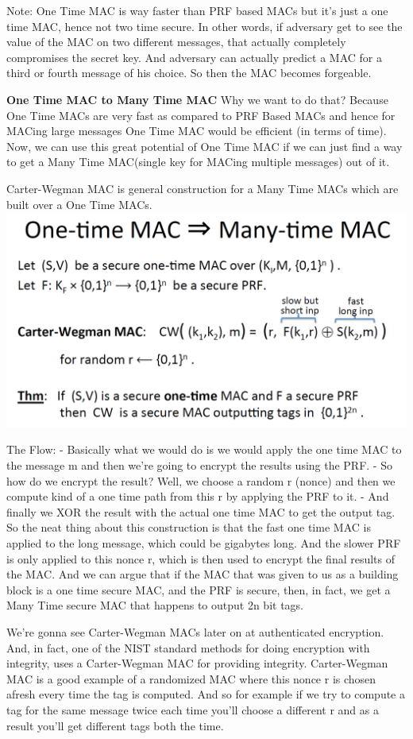 \documentclass[11pt]{article}
\makeatletter
\def\maxwidth{\ifdim\Gin@nat@width>\linewidth\linewidth
    \else\Gin@nat@width\fi}
\let\Oldincludegraphics\includegraphics
\renewcommand{\includegraphics}[1]{\Oldincludegraphics[width=.8\maxwidth]{#1}}
\makeatother
\begin{document}
Note: One Time MAC is way faster than PRF based MACs but it's just a one
time MAC, hence not two time secure. In other words, if adversary get to
see the value of the MAC on two different messages, that actually
completely compromises the secret key. And adversary can actually
predict a MAC for a third or fourth message of his choice. So then the
MAC becomes forgeable.

\textbf{One Time MAC to Many Time MAC} Why we want to do that? Because
One Time MACs are very fast as compared to PRF Based MACs and hence for
MACing large messages One Time MAC would be efficient (in terms of
time). Now, we can use this great potential of One Time MAC if we can
just find a way to get a Many Time MAC(single key for MACing multiple
messages) out of it.

Carter-Wegman MAC is general construction for a Many Time MACs which are
built over a One Time MACs. \includegraphics{./Images/OTM2MTM.png}

The Flow: - Basically what we would do is we would apply the one time
MAC to the message m and then we're going to encrypt the results using
the PRF. - So how do we encrypt the result? Well, we choose a random r
(nonce) and then we compute kind of a one time path from this r by
applying the PRF to it. - And finally we XOR the result with the actual
one time MAC to get the output tag. So the neat thing about this
construction is that the fast one time MAC is applied to the long
message, which could be gigabytes long. And the slower PRF is only
applied to this nonce r, which is then used to encrypt the final results
of the MAC. And we can argue that if the MAC that was given to us as a
building block is a one time secure MAC, and the PRF is secure, then, in
fact, we get a Many Time secure MAC that happens to output 2n bit tags.

We're gonna see Carter-Wegman MACs later on at authenticated encryption.
And, in fact, one of the NIST standard methods for doing encryption with
integrity, uses a Carter-Wegman MAC for providing integrity.
Carter-Wegman MAC is a good example of a randomized MAC where this nonce
r is chosen afresh every time the tag is computed. And so for example if
we try to compute a tag for the same message twice each time you'll
choose a different r and as a result you'll get different tags both the
time.
\end{document}
